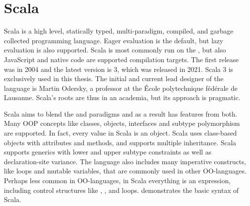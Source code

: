 



\section{Scala} \label{background:scala}
Scala is a high level, statically typed, multi-paradigm, compiled, and garbage collected programming language. Eager evaluation is the default, but lazy evaluation is also supported. Scala is most commonly run on the , but also JavaScript and native code are supported compilation targets. The first release was in 2004 and the latest version is 3, which was released in 2021. Scala 3 is exclusively used in this thesis. The initial and current lead designer of the language is Martin Odersky, a professor at the École polytechnique fédérale de Lausanne. Scala's roots are thus in an academia, but its approach is pragmatic.

Scala aims to blend the  and  paradigms and as a result has features from both. Many OOP concepts like classes, objects, interfaces and subtype polymorphism are supported. In fact, every value in Scala is an object. Scala uses class-based objects with attributes and methods, and supports multiple inheritance. Scala supports generics with lower and upper subtype constraints as well as declaration-site variance. The language also includes many imperative constructs, like loops and mutable variables, that are commonly used in other OO-languages. Perhaps less common in OO-languages, in Scala everything is an expression, including control structures like , , and loops.  demonstrates the basic syntax of Scala.



